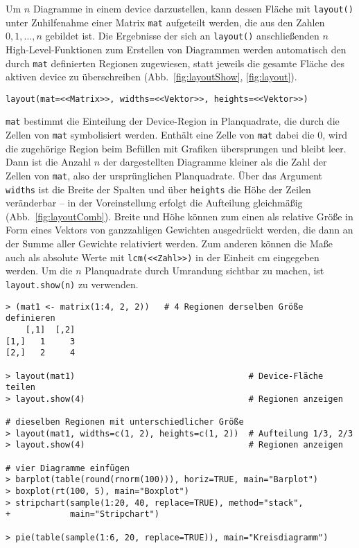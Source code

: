 Um $n$ Diagramme in einem device darzustellen, kann dessen Fläche mit \lstinline!layout()! unter Zuhilfenahme einer Matrix \lstinline!mat! aufgeteilt werden, die aus den Zahlen $0, 1, \ldots, n$ gebildet ist. Die Ergebnisse der sich an \lstinline!layout()! anschließenden $n$ High-Level-Funktionen zum Erstellen von Diagrammen werden automatisch den durch \lstinline!mat! definierten Regionen zugewiesen, statt jeweils die gesamte Fläche des aktiven device zu überschreiben (Abb.\ \ref{fig:layoutShow}, \ref{fig:layout}).
\begin{lstlisting}
layout(mat=<<Matrix>>, widths=<<Vektor>>, heights=<<Vektor>>)
\end{lstlisting}

\lstinline!mat! bestimmt die Einteilung der Device-Region in Planquadrate, die durch die Zellen von \lstinline!mat! symbolisiert werden. Enthält eine Zelle von \lstinline!mat! dabei die $0$, wird die zugehörige Region beim Befüllen mit Grafiken übersprungen und bleibt leer. Dann ist die Anzahl $n$ der dargestellten Diagramme kleiner als die Zahl der Zellen von \lstinline!mat!, also der ursprünglichen Planquadrate. Über das Argument \lstinline!widths! ist die Breite der Spalten und über \lstinline!heights! die Höhe der Zeilen veränderbar -- in der Voreinstellung erfolgt die Aufteilung gleichmäßig (Abb.\ \ref{fig:layoutComb}). Breite und Höhe können zum einen als relative Größe in Form eines Vektors von ganzzahligen Gewichten ausgedrückt werden, die dann an der Summe aller Gewichte relativiert werden. Zum anderen können die Maße auch als absolute Werte mit \lstinline!lcm(<<Zahl>>)! in der Einheit cm eingegeben werden. Um die $n$ Planquadrate durch Umrandung sichtbar zu machen, ist \lstinline!layout.show(n)! zu verwenden.
\begin{lstlisting}
> (mat1 <- matrix(1:4, 2, 2))   # 4 Regionen derselben Größe definieren
    [,1]  [,2]
[1,]   1     3
[2,]   2     4

> layout(mat1)                                   # Device-Fläche teilen
> layout.show(4)                                 # Regionen anzeigen

# dieselben Regionen mit unterschiedlicher Größe
> layout(mat1, widths=c(1, 2), heights=c(1, 2))  # Aufteilung 1/3, 2/3
> layout.show(4)                                 # Regionen anzeigen

# vier Diagramme einfügen
> barplot(table(round(rnorm(100))), horiz=TRUE, main="Barplot")
> boxplot(rt(100, 5), main="Boxplot")
> stripchart(sample(1:20, 40, replace=TRUE), method="stack",
+            main="Stripchart")

> pie(table(sample(1:6, 20, replace=TRUE)), main="Kreisdiagramm")
\end{lstlisting}

